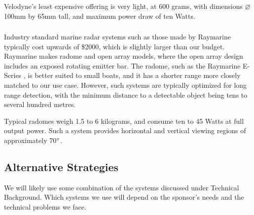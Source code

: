 Velodyne's least expensive offering is very light, at 600 grams, with dimensions $\varnothing$100mm by 65mm tall, and maximum power draw of ten Watts.

\subsubsection{\label{sec:intro:commercial:radar}}
Industry standard marine radar systems such as those made by Raymarine typically cost upwards of \$2000, which is slightly larger than our budget. Raymarine makes radome and open array models, where the open array design includes an exposed rotating emitter bar. The radome, such as the Raymarine E-Series \cite{raymarine-eseries}, is better suited to small boats, and it has a shorter range more closely matched to our use case. However, such systems are typically optimized for long range detection, with the minimum distance to a detectable object being tens to several hundred metres.

Typical radomes weigh 1.5 to 6 kilograms, and consume ten to 45 Watts at full output power. Such a system provides horizontal and vertical viewing regions of approximately 70$\degree$.

\subsection{\label{sec:intro:alternatives}Alternative Strategies}
We will likely use some combination of the systems discussed under Technical Background.  Which systems we use will depend on the sponsor's needs and the technical problems we face.
